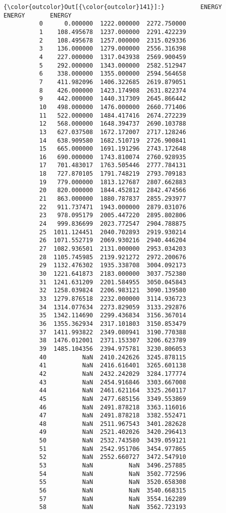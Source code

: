 \documentclass[11pt]{article}
\begin{document}
\begin{Verbatim}[commandchars=\\\{\}]
{\color{outcolor}Out[{\color{outcolor}141}]:}          ENERGY       ENERGY       ENERGY
          0      0.000000  1222.000000  2272.750000
          1    108.495678  1237.000000  2291.422239
          2    108.495678  1257.000000  2315.029336
          3    136.000000  1279.000000  2556.316398
          4    227.000000  1317.043938  2569.900459
          5    292.000000  1343.000000  2582.512947
          6    338.000000  1355.000000  2594.564658
          7    411.982096  1406.322685  2619.879051
          8    426.000000  1423.174908  2631.822374
          9    442.000000  1440.317309  2645.866442
          10   498.000000  1476.000000  2660.771406
          11   522.000000  1484.417416  2674.272239
          12   568.000000  1648.394737  2690.103788
          13   627.037508  1672.172007  2717.128246
          14   638.909580  1682.510719  2726.900841
          15   665.000000  1691.191296  2743.172648
          16   690.000000  1743.810074  2760.928935
          17   701.483017  1763.505446  2777.784131
          18   727.870105  1791.748219  2793.709183
          19   779.000000  1813.127687  2807.662883
          20   820.000000  1844.452812  2842.474566
          21   863.000000  1880.787837  2855.293977
          22   911.737471  1943.000000  2879.031076
          23   978.095179  2005.447220  2895.802806
          24   999.836699  2023.772547  2904.788875
          25  1011.124451  2040.702893  2919.930214
          26  1071.552719  2069.930216  2940.446204
          27  1082.936501  2131.000000  2953.034203
          28  1105.745985  2139.921272  2972.200676
          29  1132.476302  1935.338708  3004.092173
          30  1221.641873  2183.000000  3037.752380
          31  1241.631209  2201.584955  3050.045843
          32  1258.039824  2206.983121  3090.139580
          33  1279.876518  2232.000000  3114.936723
          34  1314.077634  2273.829059  3133.292876
          35  1342.114690  2299.436834  3156.367014
          36  1355.362934  2317.101803  3150.853479
          37  1411.993822  2349.080941  3190.770388
          38  1476.012001  2371.153307  3206.623789
          39  1485.104356  2394.975781  3230.806053
          40          NaN  2410.242626  3245.878115
          41          NaN  2416.616401  3265.601138
          42          NaN  2432.242029  3284.177774
          43          NaN  2454.916846  3303.667008
          44          NaN  2461.621164  3325.260117
          45          NaN  2477.685156  3349.553869
          46          NaN  2491.878218  3363.116016
          47          NaN  2491.878218  3382.552471
          48          NaN  2511.967543  3401.282628
          49          NaN  2521.402026  3420.296413
          50          NaN  2532.743580  3439.059121
          51          NaN  2542.951706  3454.977865
          52          NaN  2552.660727  3472.547910
          53          NaN          NaN  3496.257885
          54          NaN          NaN  3502.772596
          55          NaN          NaN  3520.658308
          56          NaN          NaN  3540.668315
          57          NaN          NaN  3554.162289
          58          NaN          NaN  3562.723193
\end{Verbatim}
            
\end{document}
